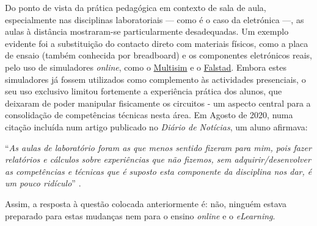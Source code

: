 Do ponto de vista da prática pedagógica em contexto de sala de aula, especialmente nas disciplinas laboratoriais — como é o caso da eletrónica —, as aulas à distância mostraram-se particularmente desadequadas. Um exemplo evidente foi a substituição do contacto direto com materiais físicos, como a placa de ensaio (também conhecida por breadboard) e os componentes eletrónicos reais, pelo uso de simuladores \textit{online}, como o \href{https://www.multisim.com/}{Multisim} e o \href{https://www.falstad.com/circuit/}{Falstad}. Embora estes simuladores já fossem utilizados como complemento às actividades presenciais, o seu uso exclusivo limitou fortemente a experiência prática dos alunos, que deixaram de poder manipular fisicamente os circuitos - um aspecto central para a consolidação de competências técnicas nesta área. Em Agosto de 2020, numa citação incluída num artigo publicado no \textit{Diário de Notícias}, um aluno afirmava:
\begin{center}
    ``\textit{As aulas de laboratório foram as que menos sentido fizeram para mim, pois fazer relatórios e cálculos sobre experiências que não fizemos, sem adquirir/desenvolver as competências e técnicas que é suposto esta componente da disciplina nos dar, é um pouco ridículo}'' \cite{impactonegativocovid}.
\end{center}

Assim, a resposta à questão colocada anteriormente é: não, ninguém estava preparado para estas mudanças nem para o ensino \textit{online} e o \textit{eLearning}.

